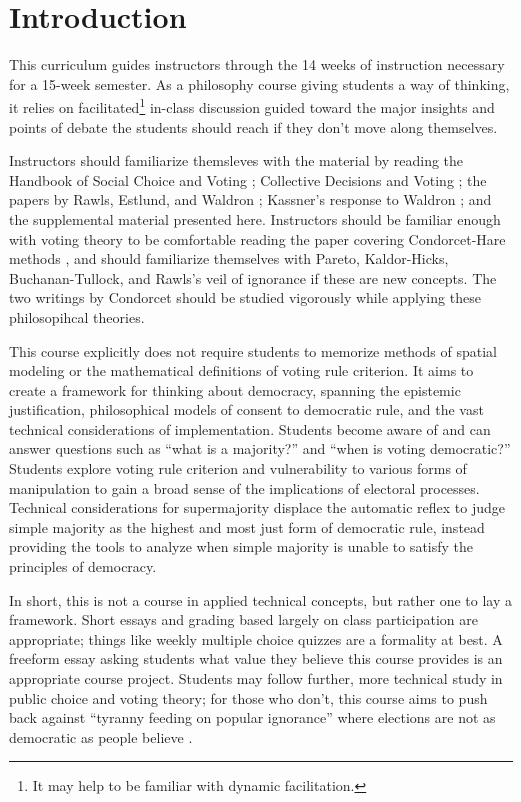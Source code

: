 \chapter{Introduction}
This curriculum guides instructors through the 14 weeks of instruction necessary for a 15-week semester.  As a philosophy course giving students a way of thinking, it relies on facilitated\footnote{It may help to be familiar with dynamic facilitation.} in-class discussion guided toward the major insights and points of debate the students should reach if they don't move along themselves.

Instructors should familiarize themsleves with the material by reading the Handbook of Social Choice and Voting \autocite{Heckelman2015}; Collective Decisions and Voting \autocite{Tideman2006}; the papers by Rawls, Estlund, and Waldron \autocite{Rawls1997,Estlund2008,Waldron1998}; Kassner's response to Waldron \autocite{Kassner2006}; and the supplemental material presented here.  Instructors should be familiar enough with voting theory to be comfortable reading the paper covering Condorcet-Hare methods \autocite{GreenArmytage2011}, and should familiarize themselves with Pareto, Kaldor-Hicks, Buchanan-Tullock, and Rawls's veil of ignorance if these are new concepts.  The two writings by Condorcet should be studied vigorously \autocite{Condorcet1781,Condorcet1789} while applying these philosopihcal theories.

This course explicitly does not require students to memorize methods of spatial modeling or the mathematical definitions of voting rule criterion.  It aims to create a framework for thinking about democracy, spanning the epistemic justification, philosophical models of consent to democratic rule, and the vast technical considerations of implementation.  Students become aware of and can answer questions such as ``what is a majority?'' and ``when is voting democratic?''  Students explore voting rule criterion and vulnerability to various forms of manipulation to gain a broad sense of the implications of electoral processes.  Technical considerations for supermajority displace the automatic reflex to judge simple majority as the highest and most just form of democratic rule, instead providing the tools to analyze when simple majority is unable to satisfy the principles of democracy.

In short, this is not a course in applied technical concepts, but rather one to lay a framework.  Short essays and grading based largely on class participation are appropriate; things like weekly multiple choice quizzes are a formality at best.  A freeform essay asking students what value they believe this course provides is an appropriate course project.  Students may follow further, more technical study in public choice and voting theory; for those who don't, this course aims to push back against ``tyranny feeding on popular ignorance'' where elections are not as democratic as people believe \autocite{Yastrebtseva2015}.